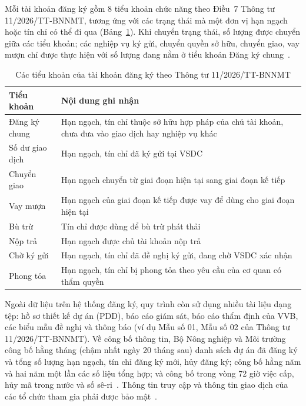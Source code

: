 Mỗi tài khoản đăng ký gồm 8 tiểu khoản chức năng theo Điều~7 Thông tư 11/2026/TT-BNNMT, tương ứng với các trạng thái mà một đơn vị hạn ngạch hoặc tín chỉ có thể đi qua (Bảng~\ref{tab:ks-tieukhoan}). Khi chuyển trạng thái, số lượng được chuyển giữa các tiểu khoản; các nghiệp vụ ký gửi, chuyển quyền sở hữu, chuyển giao, vay mượn chỉ được thực hiện với số lượng đang nằm ở tiểu khoản Đăng ký chung~\cite{vietnam2026thongtu11}.

\begin{table}[htbp]
    \centering
    \caption{Các tiểu khoản của tài khoản đăng ký theo Thông tư 11/2026/TT-BNNMT}
    \label{tab:ks-tieukhoan}
    \small
    \renewcommand{\arraystretch}{1.2}
    \begin{tabularx}{\textwidth}{|p{3.2cm}|X|}
        \hline
        \textbf{Tiểu khoản} & \textbf{Nội dung ghi nhận~\cite{vietnam2026thongtu11}} \\
        \hline
        Đăng ký chung & Hạn ngạch, tín chỉ thuộc sở hữu hợp pháp của chủ tài khoản, chưa đưa vào giao dịch hay nghiệp vụ khác \\
        \hline
        Số dư giao dịch & Hạn ngạch, tín chỉ đã ký gửi tại VSDC \\
        \hline
        Chuyển giao & Hạn ngạch chuyển từ giai đoạn hiện tại sang giai đoạn kế tiếp \\
        \hline
        Vay mượn & Hạn ngạch của giai đoạn kế tiếp được vay để dùng cho giai đoạn hiện tại \\
        \hline
        Bù trừ & Tín chỉ được dùng để bù trừ phát thải \\
        \hline
        Nộp trả & Hạn ngạch được chủ tài khoản nộp trả \\
        \hline
        Chờ ký gửi & Hạn ngạch, tín chỉ đã đề nghị ký gửi, đang chờ VSDC xác nhận \\
        \hline
        Phong tỏa & Hạn ngạch, tín chỉ bị phong tỏa theo yêu cầu của cơ quan có thẩm quyền \\
        \hline
    \end{tabularx}
\end{table}

Ngoài dữ liệu trên hệ thống đăng ký, quy trình còn sử dụng nhiều tài liệu dạng tệp: hồ sơ thiết kế dự án (PDD), báo cáo giám sát, báo cáo thẩm định của VVB, các biểu mẫu đề nghị và thông báo (ví dụ Mẫu số 01, Mẫu số 02 của Thông tư 11/2026/TT-BNNMT). Về công bố thông tin, Bộ Nông nghiệp và Môi trường công bố hằng tháng (chậm nhất ngày 20 tháng sau) danh sách dự án đã đăng ký và tổng số lượng hạn ngạch, tín chỉ đăng ký mới, hủy đăng ký; công bố hằng năm và hai năm một lần các số liệu tổng hợp; và công bố trong vòng 72 giờ việc cấp, hủy mã trong nước và số sê-ri~\cite{vietnam2026thongtu11}. Thông tin truy cập và thông tin giao dịch của các tổ chức tham gia phải được bảo mật~\cite{vietnam2026thongtu11}.

